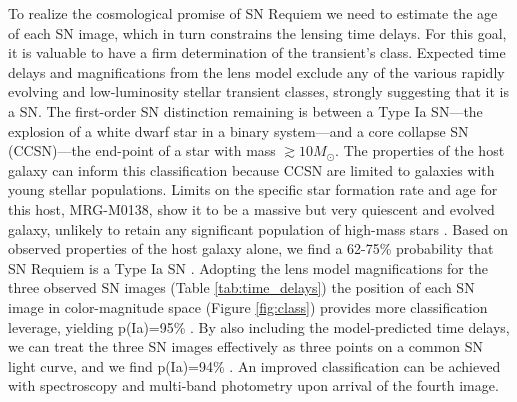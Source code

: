 \documentclass[12pt,dvipsnames]{article}
\def\SNABC{SN Requiem\xspace}
\begin{document}
 
To realize the cosmological promise of SN Requiem 
we need to estimate the age of each SN image, which in turn constrains the lensing time delays. For this
goal, it is valuable to have a firm determination of the transient’s class. Expected time delays and magnifications from the lens model exclude any of the various rapidly evolving and low-luminosity stellar transient classes, strongly suggesting that it is a SN. The first-order SN distinction remaining is between a Type Ia SN---the explosion of a white dwarf star in a binary system---and a core collapse SN (CCSN)---the end-point of a star with mass $\gtrsim 10 M_{\odot}$. 
The properties of the host galaxy can inform this classification because CCSN are limited to galaxies with young stellar populations. Limits on the specific star formation rate and age for this host, MRG-M0138, show it to be a massive but very quiescent and evolved galaxy, %
unlikely to retain any significant population of high-mass stars \cite{newman_resolving_2018}. Based on observed properties of the host galaxy alone, we find a 62-75\% probability that \SNABC is a Type Ia SN \cite{materials_methods_2020}. Adopting the lens model magnifications for the three observed SN images (Table \ref{tab:time_delays}) the position of each SN image in color-magnitude space (Figure \ref{fig:class}) provides more classification leverage, yielding p(Ia)=95\% \cite{materials_methods_2020}. By also including the model-predicted time delays, we can treat the three SN images effectively as three points on a common SN light curve, and we find p(Ia)=94\% \cite{materials_methods_2020}.
An improved classification can be achieved with spectroscopy and multi-band photometry upon arrival of the fourth image.


\end{document}

